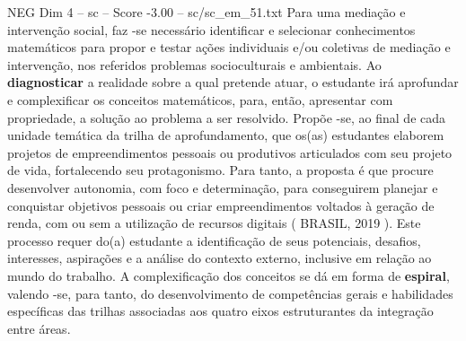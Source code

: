\begin{textsample}{NEG Dim 4 – sc – Score -3.00 – sc/sc\_em\_51.txt}
Para uma mediação e intervenção social, faz -se necessário identificar e selecionar conhecimentos matemáticos para propor e testar ações individuais e/ou coletivas de mediação e intervenção, nos referidos problemas socioculturais e ambientais.
Ao \textbf{diagnosticar} a realidade sobre a qual pretende atuar, o estudante irá aprofundar e complexificar os conceitos matemáticos, para, então, apresentar com propriedade, a solução ao problema a ser resolvido.
Propõe -se, ao final de cada unidade temática da trilha de aprofundamento, que os(as) estudantes elaborem projetos de empreendimentos pessoais ou produtivos articulados com seu projeto de vida, fortalecendo seu protagonismo.
Para tanto, a proposta é que procure desenvolver autonomia, com foco e determinação, para conseguirem planejar e conquistar objetivos pessoais ou criar empreendimentos voltados à geração de renda, com ou sem a utilização de recursos digitais ( BRASIL, 2019 ).
Este processo requer do(a) estudante a identificação de seus potenciais, desafios, interesses, aspirações e a análise do contexto externo, inclusive em relação ao mundo do trabalho.
A complexificação dos conceitos se dá em forma de \textbf{espiral}, valendo -se, para tanto, do desenvolvimento de competências gerais e habilidades específicas das trilhas associadas aos quatro eixos estruturantes da integração entre áreas.

\end{textsample}
